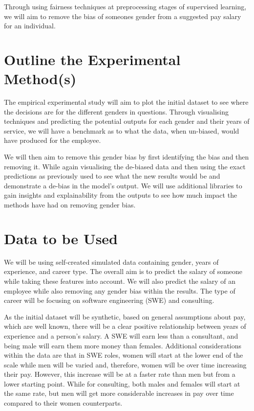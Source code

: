 \documentclass{sigchi}
\begin{document}
Through using fairness techniques at preprocessing stages \cite{ntoutsi2020bias} of supervised learning, we will aim to remove the bias of someones gender from a suggested pay salary for an individual. %



\section{Outline the Experimental Method(s)}
The empirical experimental study will aim to plot the initial dataset to see where the decisions are for the different genders in questions. Through visualising techniques and predicting the potential outputs for each gender and their years of service, we will have a benchmark as to what the data, when un-biased, would have produced for the employee.

We will then aim to remove this gender bias by first identifying the bias and then removing it. While again visualising the de-biased data and then using the exact predictions as previously used to see what the new results would be and demonstrate a de-bias in the model's output. We will use additional libraries to gain insights and explainability from the outputs to see how much impact the methods have had on removing gender bias.

\section{Data to be Used}
We will be using self-created simulated data containing gender, years of experience, and career type. The overall aim is to predict the salary of someone while taking these features into account. We will also predict the salary of an employee while also removing any gender bias within the results. The type of career will be focusing on software engineering (SWE) and consulting.

As the initial dataset will be synthetic, based on general assumptions about pay, which are well known, there will be a clear positive relationship between years of experience and a person's salary. A SWE will earn less than a consultant, and being male will earn them more money than females. Additional considerations within the data are that in SWE roles, women will start at the lower end of the scale while men will be varied and, therefore, women will be over time increasing their pay. However, this increase will be at a faster rate than men but from a lower starting point. While for consulting, both males and females will start at the same rate, but men will get more considerable increases in pay over time compared to their women counterparts.
\end{document}
